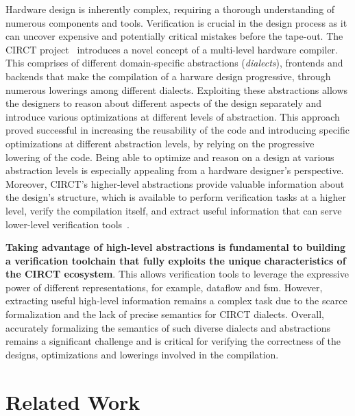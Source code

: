 \documentclass[sigconf,authorversion,nonacm, 11pt]{acmart}
\begin{document}
Hardware design is inherently complex, requiring a thorough understanding of numerous components and tools. 
Verification is crucial in the design process as it can uncover expensive and potentially critical mistakes before the tape-out.
The CIRCT project~\cite{circt, mlir_circt} introduces a novel concept of a multi-level hardware compiler.
This comprises of different domain-specific abstractions (\textit{dialects}), 
frontends and backends that make the compilation of a harware design progressive, through numerous lowerings among different dialects. 
Exploiting these abstractions allows the designers to reason about different aspects of the design separately and introduce various 
optimizations at different levels of abstraction.
This approach proved successful in increasing the reusability of the code and introducing specific optimizations at different abstraction levels, 
by relying on the progressive lowering of the code. 
Being able to optimize and reason on a design at various abstraction levels is especially appealing from a hardware 
designer's perspective.
Moreover, CIRCT's higher-level abstractions provide valuable information about the design's structure, 
which is available to perform verification tasks at a higher level, verify the compilation itself, 
and extract useful information that can serve lower-level verification tools~\cite{huang2018instruction, chen2021leveraging, mattarei2018cosa}. 

\textbf{Taking advantage of high-level abstractions is fundamental to building a verification toolchain that fully exploits the unique characteristics 
of the CIRCT ecosystem}. This allows verification tools to leverage the expressive power of different representations, for example, dataflow and \ac{fsm}. 
However, extracting useful high-level information remains a complex task due to the scarce formalization and the lack of precise 
semantics for CIRCT dialects. Overall, accurately formalizing the semantics of such diverse dialects and abstractions remains a 
significant challenge and is critical for verifying the correctness of the designs, optimizations and lowerings involved in the compilation. 


\section{Related Work}
\end{document}
